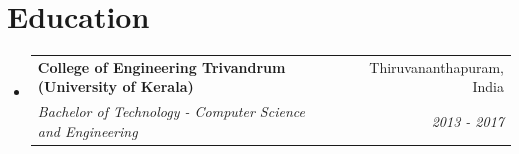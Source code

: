 \documentclass[a4paper,20pt]{article}
\makeatletter
\newcommand{\resumeItem}[2]{
  \item\small{
    \textbf{#1}{: #2 \vspace{-2pt}}
  }
}
\newcommand{\resumeSubheading}[4]{
  \vspace{-1pt}\item
    \begin{tabular*}{0.97\textwidth}{l@{\extracolsep{\fill}}r}
      \textbf{#1} & #2 \\
      \textit{#3} & \textit{#4} \\
    \end{tabular*}\vspace{-5pt}
}
\newcommand{\resumeSubItem}[2]{\resumeItem{#1}{#2}\vspace{-3pt}}
\newcommand{\resumeSubHeadingListStart}{\begin{itemize}[leftmargin=*]}
\newcommand{\resumeSubHeadingListEnd}{\end{itemize}}
\makeatother
\begin{document}

\vspace{-5pt}
\section{Education}
  \resumeSubHeadingListStart
    \resumeSubheading
      {College of Engineering Trivandrum (University of Kerala)}{Thiruvananthapuram, India}
      {Bachelor of Technology - Computer Science and Engineering}{2013 - 2017}
  \resumeSubHeadingListEnd

\vspace{-5pt}
\end{document}
